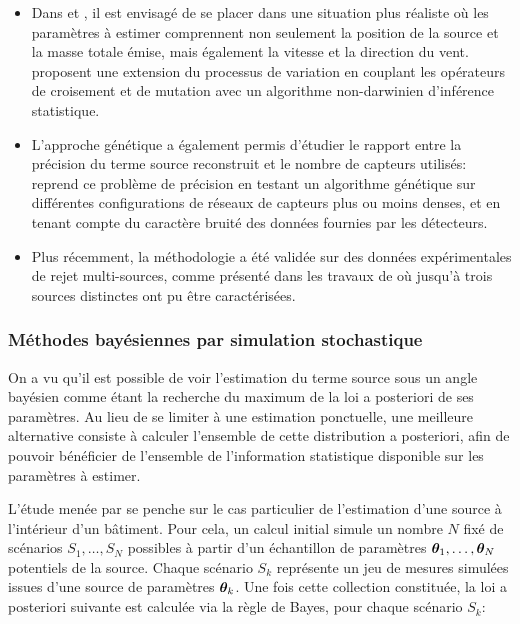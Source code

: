 \begin{itemize}
 	\item Dans \cite{Allen2007} et \cite{Haupt2007}, il est envisagé de se placer dans une situation plus réaliste où les paramètres à estimer comprennent non seulement la position de la source et la masse totale émise, mais également la vitesse et la direction du vent. \cite{Cervone2011} proposent une extension du processus de variation en couplant les opérateurs de croisement et de mutation avec un algorithme non-darwinien d'inférence statistique.
 \item L'approche génétique a également permis d'étudier le rapport entre la précision du terme source reconstruit et le nombre de capteurs utilisés: \cite{Long2010} reprend ce problème de précision en testant un algorithme génétique sur différentes configurations de réseaux de capteurs plus ou moins denses, et en tenant compte du caractère bruité des données fournies par les détecteurs. 
 \item Plus récemment, la méthodologie a été validée sur des données expérimentales de rejet multi-sources, comme présenté dans les travaux de \cite{Cantelli2015} où jusqu'à trois sources distinctes ont pu être caractérisées.\\
 \end{itemize}
 
 \subsubsection{Méthodes bayésiennes par simulation stochastique}
 
 On a vu qu'il est possible de voir l'estimation du terme source sous un angle bayésien  comme étant la recherche du maximum  de la loi a posteriori de ses paramètres. Au lieu de se limiter à une estimation ponctuelle, une meilleure alternative consiste à calculer l'ensemble de cette distribution a posteriori, afin de pouvoir bénéficier {de l'ensemble de l'information statistique} disponible sur les paramètres à estimer. 
 
 L'étude menée par \cite{Sohn2002} se penche sur le cas particulier de l'estimation d'une source à l'intérieur d'un bâtiment. Pour cela, un calcul initial simule un nombre $N$ fixé de scénarios $S_1,\dots,S_N$ possibles à partir d'un échantillon de paramètres ${\bm{\theta}}_1, \dots, {\bm{\theta}}_N$ potentiels de la source. Chaque scénario $S_k$ représente un jeu de mesures simulées issues d'une source de paramètres ${\bm{\theta}}_k$. Une fois cette collection constituée, la loi a posteriori suivante est calculée via la règle de Bayes, pour chaque scénario $S_k$:
 
